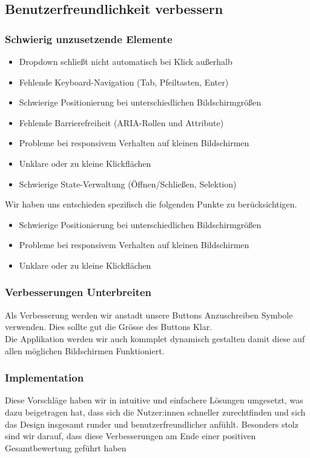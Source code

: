 \documentclass[10pt]{article}
\begin{document}
	
	
	\subsection{Benutzerfreundlichkeit verbessern}
	\subsubsection{Schwierig unzusetzende Elemente}
	\begin{itemize}
		\item 	Dropdown schließt nicht automatisch bei Klick außerhalb
		\item 	Fehlende Keyboard-Navigation (Tab, Pfeiltasten, Enter)
		\item 	Schwierige Positionierung bei unterschiedlichen Bildschirmgrößen
		\item 	Fehlende Barrierefreiheit (ARIA-Rollen und Attribute)
		\item 	Probleme bei responsivem Verhalten auf kleinen Bildschirmen
		\item 	Unklare oder zu kleine Klickflächen
		\item 	Schwierige State-Verwaltung (Öffnen/Schließen, Selektion)
	\end{itemize}
	Wir haben uns entschieden spezifisch die folgenden Punkte zu berücksichtigen.
	\begin{itemize}
		\item 	Schwierige Positionierung bei unterschiedlichen Bildschirmgrößen
		\item 	Probleme bei responsivem Verhalten auf kleinen Bildschirmen
		\item 	Unklare oder zu kleine Klickflächen
	\end{itemize}

	\subsubsection{Verbesserungen Unterbreiten}
	Als Verbesserung werden wir anstadt unsere Buttons Anzuschreiben Symbole verwenden. Dies sollte gut die Grösse des Buttons Klar.\\
	Die Applikation werden wir auch kommplet dynamisch gestalten damit diese auf allen möglichen Bildschirmen Funktioniert.
	
	\subsubsection{Implementation}
	Diese Vorschläge haben wir in intuitive und einfachere Lösungen umgesetzt, was dazu beigetragen hat, dass sich die Nutzer:innen schneller zurechtfinden und sich das Design insgesamt runder und benutzerfreundlicher anfühlt. Besonders stolz sind wir darauf, dass diese Verbesserungen am Ende einer positiven Gesamtbewertung geführt haben
	

	

	

	

	

	

	

	
\end{document}
